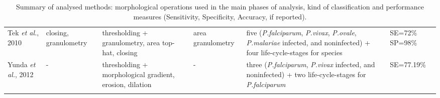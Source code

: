 \begin{longtable}{C{2.1cm} C{2.1cm} C{2.3cm} C{1.5cm} C{2.7cm} C{2.2cm} }
    Tek \emph{et al.}, 2010  &
    	closing, granulometry &
    	thresholding + granulometry, area top-hat, closing  &
    	area granulometry &
    	five (\emph{P.falciparum}, \emph{P.vivax}, \emph{P.ovale}, \emph{P.malariae} infected, and noninfected) +
    four life-cycle-stages for species &
    	SE=72\% SP=98\% \vspace{0.6cm} \\ 

    Yunda \emph{et al.}, 2012  &
    	- &
    	thresholding + morphological gradient, erosion, dilation  &
    	- &
    	three (\emph{P.falciparum}, \emph{P.vivax} infected, and noninfected) + two life-cycle-stages for \emph{P.falciparum}&
    	SE=77.19\% \\
    	  	
		 \hline
		
				
	\caption{Summary of analysed methods: morphological operations used in the main phases of analysis, kind of classification and performance measures (Sensitivity, Specificity, Accuracy, if reported).} %
	\label{tab:summary_table}
	\end{longtable}

	